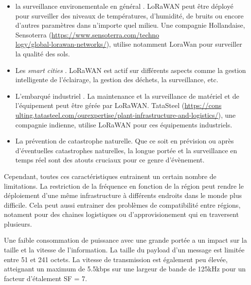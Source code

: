 \begin{itemize}

\item la surveillance environementale en général \cite{lorauc1}. LoRaWAN peut être déployé pour surveiller des niveaux de températures, d'humidité, de bruits ou encore d'autres paramètres dans n'importe quel milieu. Une compagnie Hollandaise, Sensoterra (\href{https://www.sensoterra.com/technology/global-lorawan-networks/}{https://www.sensoterra.com/techno \\ logy/global-lorawan-networks/}), utilise notamment LoraWan pour surveiller la qualité des sols.
\item Les \textit{smart cities} \cite{lorauc2}. LoRaWAN est actif sur différents aspects comme la gestion intelligente de l'éclairage, la gestion des déchets, la surveillance, etc.
\item L'embarqué industriel \cite{lorauc3}. La maintenance et la surveillance de matériel et de l'équipement peut être gérée par LoRaWAN. TataSteel (\href{https://consulting.tatasteel.com/our_expertise/plant-infrastructure-and-logistics/}{https://cons \\ ulting.tatasteel.com/ourexpertise/plant-infrastructure-and-logistics/}), une compagnie indienne, utilise LoRaWAN pour ces équipements industriels.
\item La prévention de catastrophe naturelle. Que ce soit en prévision\cite{lorauc41} ou après\cite{lorauc43} d'éventuelles catastrophes naturelles, la longue portée et la surveillance en temps réel sont des atouts cruciaux pour ce genre d'évènement.
\end{itemize}

\vspace{0.1cm}

Cependant, toutes ces caractéristiques entrainent un certain nombre de limitations. La restriction de la fréquence en fonction de la région peut rendre le déploiement d'une même infrastructure à différents endroits dans le monde plus difficile. Cela peut aussi entrainer des problèmes de compatibilité entre régions, notament pour des chaines logistiques ou d'approvisionement qui en traversent plusieurs.

\vspace{0.1cm}

Une faible consommation de puissance avec une grande portée a un impact sur la taille et la vitesse de l'information. La taille du payload d'un message est limitée entre 51 et 241 octets. La vitesse de transmission est également peu élevée, atteignant un maximum de 5.5kbps sur une largeur de bande de 125kHz pour un facteur d'étalement SF = 7.

